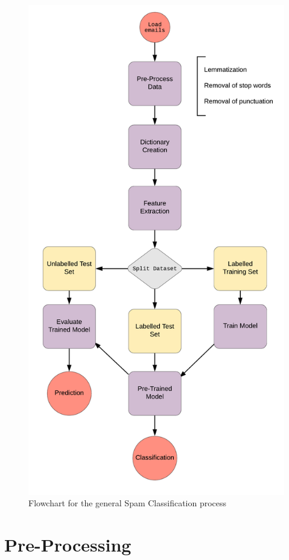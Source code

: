 \documentclass[11pt, a4paper]{article}
\begin{document}
\begin{figure}[h!]
\centering
\includegraphics[scale=0.2]{spam_flowchart}
\caption{Flowchart for the general Spam Classification process}
\label{fig:flowchart}
\end{figure}
\newpage

\section{Pre-Processing}
\end{document}
